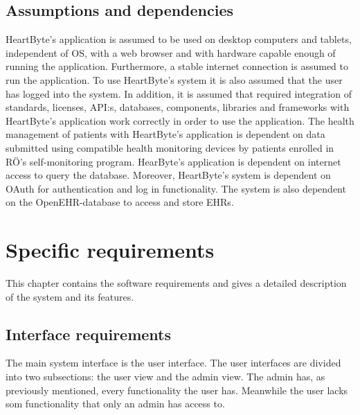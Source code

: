 \documentclass{scrreprt}
\begin{document}
\section{Assumptions and dependencies}
HeartByte’s application is assumed to be used on desktop computers and tablets, independent of OS, with a web browser and with hardware capable enough of running the application. Furthermore, a stable internet connection is assumed to run the application. To use HeartByte’s system it is also assumed that the user has logged into the system. In addition, it is assumed that required integration of standards, licenses, API:s, databases, components, libraries and frameworks with HeartByte’s application work correctly in order to use the application.
\newline
\newline
The health management of patients with HeartByte’s application is dependent on data submitted using compatible health monitoring devices by patients enrolled in RÖ’s self-monitoring program. HearByte’s application is dependent on internet access to query the database. Moreover, HeartByte’s system is dependent on OAuth for authentication and log in functionality. The system is also dependent on the OpenEHR-database to access and store EHRs.



\chapter{Specific requirements}
This chapter contains the software requirements and gives a detailed
description of the system and its features. 

\section{Interface requirements}
The main system interface is the user interface. The user interfaces are divided into two subsections: the user view and the admin view. The admin has, as previously mentioned, every functionality the user has. Meanwhile the user lacks som functionality that only an admin has access to. 
\end{document}
